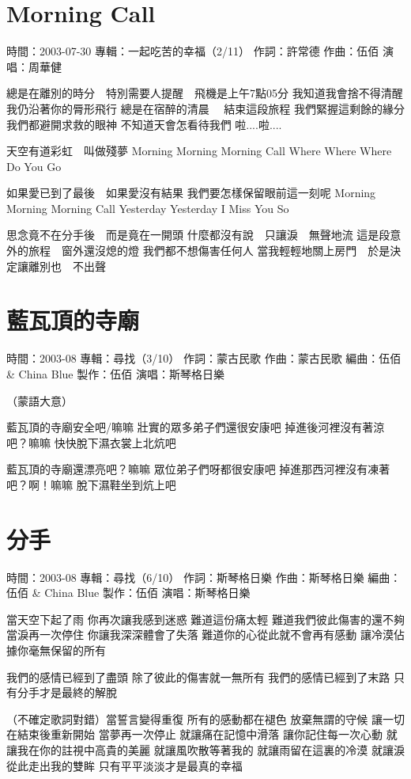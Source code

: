 \documentclass[UTF8,a4paper,oneside,twocolumn,12pt]{ctexbook}
\newcommand{\infopair}[2]{\textbullet #1：#2}
\newcommand{\zc}[1][伍佰]{\infopair{作詞}{#1}}
\newcommand{\zq}[1][伍佰]{\infopair{作曲}{#1}}
\newcommand{\bq}[1][伍佰]{\infopair{編曲}{#1}}
\newcommand{\zj}[1]{\infopair{專輯}{#1}}
\newcommand{\zz}[1]{\infopair{製作}{#1}}
\newcommand{\sj}[1]{\infopair{時間}{#1}}
\newenvironment{info}{\begin{flushleft}\kaishu
	}
	{\end{flushleft}\normalsize\yahei\par}
\newenvironment{lyric}{
	}
{}
\begin{document}
\section{Morning Call}
\begin{info}
	\sj{2003-07-30}
	\zj{一起吃苦的幸福（2/11）}
	\zc[許常德]
	\zq
	\infopair{演唱}{周華健}
\end{info}
\begin{lyric}
	總是在離別的時分　特別需要人提醒　飛機是上午7點05分
	我知道我會捨不得清醒　我仍沿著你的脣形飛行
	總是在宿醉的清晨 　結束這段旅程
	我們緊握這剩餘的緣分　我們都避開求救的眼神
	不知道天會怎看待我們
	啦....啦....

	天空有道彩虹　叫做殘夢
	Morning Morning Morning Call
	Where Where Where Do You Go

	如果愛已到了最後　如果愛沒有結果
	我們要怎樣保留眼前這一刻呢
	Morning Morning Morning Call
	Yesterday Yesterday I Miss You So

	思念竟不在分手後　而是竟在一開頭
	什麼都沒有說　只讓淚　無聲地流
	這是段意外的旅程　窗外還沒熄的燈
	我們都不想傷害任何人
	當我輕輕地關上房門　於是決定讓離別也　不出聲
\end{lyric}

\section{藍瓦頂的寺廟}
\begin{info}
	\sj{2003-08}
	\zj{尋找（3/10）}
	\zc[蒙古民歌]
	\zq[蒙古民歌]
	\bq[伍佰 \& China Blue]
	\zz{伍佰}
	\infopair{演唱}{斯琴格日樂}
\end{info}
\begin{lyric}
	（蒙語大意）

	藍瓦頂的寺廟安全吧/嘛嘛
	壯實的眾多弟子們還很安康吧
	掉進後河裡沒有著涼吧？嘛嘛
	快快脫下濕衣裳上北炕吧

	藍瓦頂的寺廟還漂亮吧？嘛嘛
	眾位弟子們呀都很安康吧
	掉進那西河裡沒有凍著吧？啊！嘛嘛
	脫下濕鞋坐到炕上吧
\end{lyric}

\section{分手}
\begin{info}
	\sj{2003-08}
	\zj{尋找（6/10）}
	\zc[斯琴格日樂]
	\zq[斯琴格日樂]
	\bq[伍佰 \& China Blue]
	\zz{伍佰}
	\infopair{演唱}{斯琴格日樂}
\end{info}
\begin{lyric}
	當天空下起了雨
	你再次讓我感到迷惑
	難道這份痛太輕
	難道我們彼此傷害的還不夠
	當淚再一次停住
	你讓我深深體會了失落
	難道你的心從此就不會再有感動
	讓冷漠佔據你毫無保留的所有

	我們的感情已經到了盡頭
	除了彼此的傷害就一無所有
	我們的感情已經到了末路
	只有分手才是最終的解脫

	（不確定歌詞對錯）當誓言變得重復
	所有的感動都在褪色
	放棄無謂的守候
	讓一切在結束後重新開始
	當夢再一次停止
	就讓痛在記憶中滑落
	讓你記住每一次心動
	就讓我在你的註視中高貴的美麗
	就讓風吹散等著我的
	就讓雨留在這裏的冷漠
	就讓淚從此走出我的雙眸
	只有平平淡淡才是最真的幸福
\end{lyric}
\end{document}
